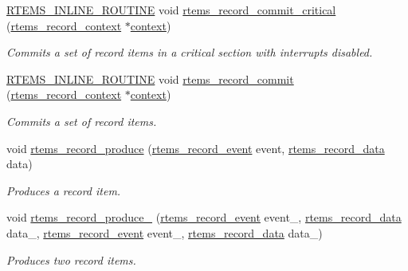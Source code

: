 \begin{DoxyCompactItemize}
\mbox{\hyperlink{group__RTEMSScoreBaseDefs_gac216239df231d5dbd15e3520b0b9313f}{R\+T\+E\+M\+S\+\_\+\+I\+N\+L\+I\+N\+E\+\_\+\+R\+O\+U\+T\+I\+NE}} void \mbox{\hyperlink{group__RTEMSRecord_ga2a34e1207be9164960fd9fe9bf18bb57}{rtems\+\_\+record\+\_\+commit\+\_\+critical}} (\mbox{\hyperlink{structrtems__record__context}{rtems\+\_\+record\+\_\+context}} $\ast$\mbox{\hyperlink{sun4u_2tte_8h_a9b4a99475e2709333b8e5d70483173f1}{context}})
\begin{DoxyCompactList}\small\item\em Commits a set of record items in a critical section with interrupts disabled. \end{DoxyCompactList}\item 
\mbox{\hyperlink{group__RTEMSScoreBaseDefs_gac216239df231d5dbd15e3520b0b9313f}{R\+T\+E\+M\+S\+\_\+\+I\+N\+L\+I\+N\+E\+\_\+\+R\+O\+U\+T\+I\+NE}} void \mbox{\hyperlink{group__RTEMSRecord_gac80cf4761566e19371353c9c72271e84}{rtems\+\_\+record\+\_\+commit}} (\mbox{\hyperlink{structrtems__record__context}{rtems\+\_\+record\+\_\+context}} $\ast$\mbox{\hyperlink{sun4u_2tte_8h_a9b4a99475e2709333b8e5d70483173f1}{context}})
\begin{DoxyCompactList}\small\item\em Commits a set of record items. \end{DoxyCompactList}\item 
void \mbox{\hyperlink{group__RTEMSRecord_ga136d81367324d6729819192181ea68bb}{rtems\+\_\+record\+\_\+produce}} (\mbox{\hyperlink{group__RTEMSRecord_gac748f47c13acd7d0595694ed7f19074b}{rtems\+\_\+record\+\_\+event}} event, \mbox{\hyperlink{group__RTEMSRecord_gab483bd3ec735835dac6788b78c817eab}{rtems\+\_\+record\+\_\+data}} data)
\begin{DoxyCompactList}\small\item\em Produces a record item. \end{DoxyCompactList}\item 
void \mbox{\hyperlink{group__RTEMSRecord_gaa5332b5d70ad8e147ebe44ca25341944}{rtems\+\_\+record\+\_\+produce\+\_}} (\mbox{\hyperlink{group__RTEMSRecord_gac748f47c13acd7d0595694ed7f19074b}{rtems\+\_\+record\+\_\+event}} event\+\_, \mbox{\hyperlink{group__RTEMSRecord_gab483bd3ec735835dac6788b78c817eab}{rtems\+\_\+record\+\_\+data}} data\+\_, \mbox{\hyperlink{group__RTEMSRecord_gac748f47c13acd7d0595694ed7f19074b}{rtems\+\_\+record\+\_\+event}} event\+\_, \mbox{\hyperlink{group__RTEMSRecord_gab483bd3ec735835dac6788b78c817eab}{rtems\+\_\+record\+\_\+data}} data\+\_)
\begin{DoxyCompactList}\small\item\em Produces two record items. \end{DoxyCompactList}\item 

\end{DoxyCompactItemize}
